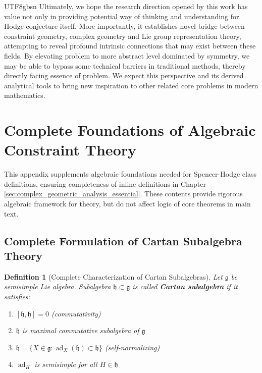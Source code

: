 \documentclass[a4paper,12pt]{extarticle}
\newtheorem{definition}[theorem]{Definition}
\theoremstyle{definition}
\begin{document}
\begin{CJK}{UTF8}{gbsn}
Ultimately, we hope the research direction opened by this work has value not only in providing potential way of thinking and understanding for Hodge conjecture itself. More importantly, it establishes novel bridge between constraint geometry, complex geometry and Lie group representation theory, attempting to reveal profound intrinsic connections that may exist between these fields. By elevating problem to more abstract level dominated by symmetry, we may be able to bypass some technical barriers in traditional methods, thereby directly facing essence of problem. We expect this perspective and its derived analytical tools to bring new inspiration to other related core problems in modern mathematics.

\appendix

\section{Complete Foundations of Algebraic Constraint Theory}
\label{appendix:algebraic_foundations}

This appendix supplements algebraic foundations needed for Spencer-Hodge class definitions, ensuring completeness of inline definitions in Chapter \ref{sec:complex_geometric_analysis_essential}. These contents provide rigorous algebraic framework for theory, but do not affect logic of core theorems in main text.

\subsection{Complete Formulation of Cartan Subalgebra Theory}
\label{appendix:subsec_cartan_complete}

\begin{definition}[Complete Characterization of Cartan Subalgebras]
\label{appendix:def_cartan_complete}
Let $\mathfrak{g}$ be semisimple Lie algebra. Subalgebra $\mathfrak{h} \subset \mathfrak{g}$ is called \textbf{Cartan subalgebra} if it satisfies:
\begin{enumerate}
    \item $[\mathfrak{h}, \mathfrak{h}] = 0$ (commutativity)
    \item $\mathfrak{h}$ is maximal commutative subalgebra of $\mathfrak{g}$
    \item $\mathfrak{h} = \{X \in \mathfrak{g} : \operatorname{ad}_X(\mathfrak{h}) \subset \mathfrak{h}\}$ (self-normalizing)
    \item $\operatorname{ad}_H$ is semisimple for all $H \in \mathfrak{h}$
\end{enumerate}
\end{definition}


\end{CJK}
\end{document}
